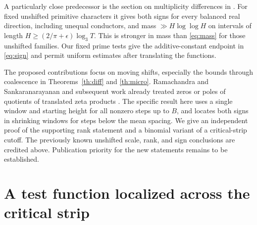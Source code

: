 \documentclass[11pt]{article}
\newcommand{\lthree}{\log_3 T}
\begin{document}
A particularly close predecessor is the section on multiplicity differences
in \cite{short}. For fixed unshifted primitive characters it gives both
signs for every balanced real direction, including unequal conductors, and
mass $\gg H\log\log H$ on intervals of length $H\ge(2/\pi+\epsilon)\lthree$.
This is stronger in mass than \eqref{eq:mass} for those unshifted families.
Our fixed prime tests give the additive-constant endpoint in \eqref{eq:sign}
and permit uniform estimates after translating the functions.

The proposed contributions focus on moving shifts, especially the bounds
through coalescence in Theorems~\ref{th:diff} and \ref{th:micro}.
Ramachandra and Sankaranarayanan and subsequent work already treated zeros
or poles of quotients of translated zeta products \cite{trans,brss}.
The specific result here uses a single window and starting height for all
nonzero steps up to $B$, and locates both signs in shrinking windows for
steps below the mean spacing. We give an independent proof of the supporting
rank statement and a binomial variant of a critical-strip cutoff. The
previously known unshifted scale, rank, and sign conclusions are credited
above. Publication priority for the new statements remains to be established.

\section{A test function localized across the critical strip}
\end{document}
